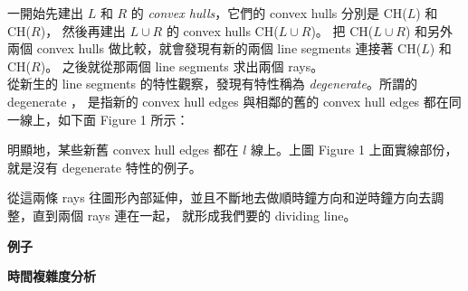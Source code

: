 \documentclass[12pt]{article}
\begin{document}
\begin{CJK}{UTF8}{bkai}
一開始先建出 $L$ 和 $R$ 的 {\it convex hulls}，它們的 convex hulls 分別是 CH($L$) 和 CH($R$)，
然後再建出 $L \cup R$ 的 convex hulls CH($L \cup R$)。
把 CH($L \cup R$) 和另外兩個 convex hulls 做比較，就會發現有新的兩個 line segments 連接著
 CH($L$) 和 CH($R$)。
之後就從那兩個 line segments 求出兩個 rays。\\

從新生的 line segments 的特性觀察，發現有特性稱為 {\it degenerate}。所謂的 degenerate ，
是指新的 convex hull edges 與相鄰的舊的 convex hull edges 都在同一線上，如下面 Figure 1 所示：


明顯地，某些新舊 convex hull edges 都在 $l$ 線上。上圖 Figure 1 上面實線部份，就是沒有 degenerate
 特性的例子。


從這兩條 rays 往圖形內部延伸，並且不斷地去做順時鐘方向和逆時鐘方向去調整，直到兩個 rays 連在一起，
就形成我們要的 dividing line。\\

\centerline{\bf 例子}

\centerline{\bf 時間複雜度分析}

\end{CJK}
\end{document}
